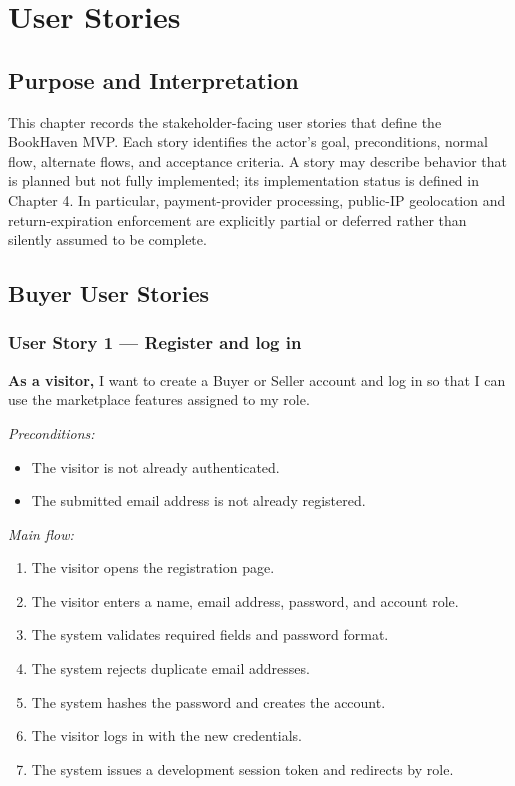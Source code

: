 \documentclass[11pt]{scrreprt}
\begin{document}
\chapter{User Stories}

\section{Purpose and Interpretation}
This chapter records the stakeholder-facing user stories that define the
BookHaven MVP. Each story identifies the actor's goal, preconditions, normal
flow, alternate flows, and acceptance criteria. A story may describe behavior
that is planned but not fully implemented; its implementation status is defined
in Chapter 4. In particular, payment-provider processing, public-IP
geolocation and return-expiration enforcement are explicitly partial or
deferred rather than silently assumed to be complete.

\section{Buyer User Stories}

\subsection{User Story 1 --- Register and log in}
\textbf{As a visitor,} I want to create a Buyer or Seller account and log in
so that I can use the marketplace features assigned to my role.

\textit{Preconditions:}
\begin{itemize}
\item The visitor is not already authenticated.
\item The submitted email address is not already registered.
\end{itemize}

\textit{Main flow:}
\begin{enumerate}
\item The visitor opens the registration page.
\item The visitor enters a name, email address, password, and account role.
\item The system validates required fields and password format.
\item The system rejects duplicate email addresses.
\item The system hashes the password and creates the account.
\item The visitor logs in with the new credentials.
\item The system issues a development session token and redirects by role.
\end{enumerate}
\end{document}
